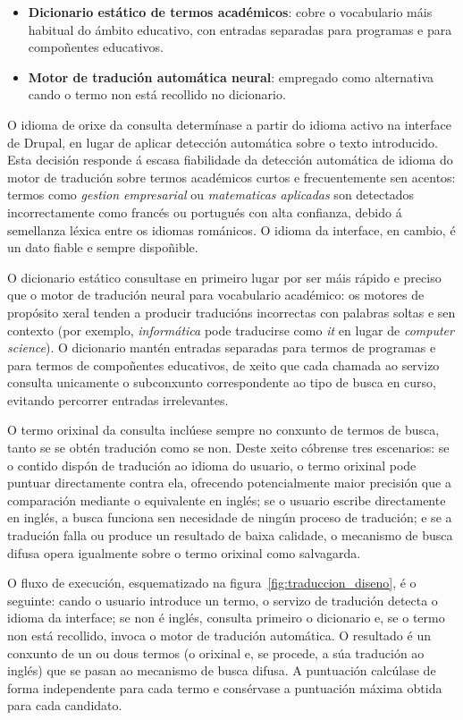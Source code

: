 \documentclass[%
    a4paper,               %
    twoside,               %
    10pt,                  %
]{article}                 %
\begin{document}
\begin{itemize}
    \item \textbf{Dicionario estático de termos académicos}: cobre o vocabulario máis habitual do ámbito educativo, con entradas separadas para programas e para compoñentes educativos.
    \item \textbf{Motor de tradución automática neural}: empregado como alternativa cando o termo non está recollido no dicionario.
\end{itemize}

O idioma de orixe da consulta determínase a partir do idioma activo na interface de Drupal, en lugar de aplicar detección automática sobre o texto introducido. Esta decisión responde á escasa fiabilidade da detección automática de idioma do motor de tradución sobre termos académicos curtos e frecuentemente sen acentos: termos como \textit{gestion empresarial} ou \textit{matematicas aplicadas} son detectados incorrectamente como francés ou portugués con alta confianza, debido á semellanza léxica entre os idiomas románicos. O idioma da interface, en cambio, é un dato fiable e sempre dispoñible.

O dicionario estático consultase en primeiro lugar por ser máis rápido e preciso que o motor de tradución neural para vocabulario académico: os motores de propósito xeral tenden a producir traducións incorrectas con palabras soltas e sen contexto (por exemplo, \textit{informática} pode traducirse como \textit{it} en lugar de \textit{computer science}). O dicionario mantén entradas separadas para termos de programas e para termos de compoñentes educativos, de xeito que cada chamada ao servizo consulta unicamente o subconxunto correspondente ao tipo de busca en curso, evitando percorrer entradas irrelevantes.

O termo orixinal da consulta inclúese sempre no conxunto de termos de busca, tanto se se obtén tradución como se non. Deste xeito cóbrense tres escenarios: se o contido dispón de tradución ao idioma do usuario, o termo orixinal pode puntuar directamente contra ela, ofrecendo potencialmente maior precisión que a comparación mediante o equivalente en inglés; se o usuario escribe directamente en inglés, a busca funciona sen necesidade de ningún proceso de tradución; e se a tradución falla ou produce un resultado de baixa calidade, o mecanismo de busca difusa opera igualmente sobre o termo orixinal como salvagarda.

O fluxo de execución, esquematizado na figura~\ref{fig:traduccion_diseno}, é o seguinte: cando o usuario introduce un termo, o servizo de tradución detecta o idioma da interface; se non é inglés, consulta primeiro o dicionario e, se o termo non está recollido, invoca o motor de tradución automática. O resultado é un conxunto de un ou dous termos (o orixinal e, se procede, a súa tradución ao inglés) que se pasan ao mecanismo de busca difusa. A puntuación calcúlase de forma independente para cada termo e consérvase a puntuación máxima obtida para cada candidato.
\end{document}
